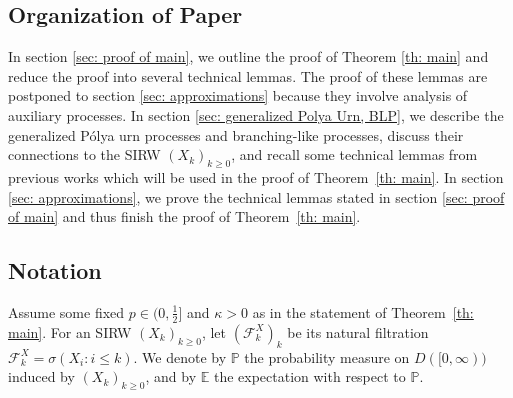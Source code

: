 \documentclass[EJP]{ejpecp} %
\begin{document}
\subsection{Organization of Paper}
In section \ref{sec: proof of main}, we outline the proof of Theorem \ref{th: main} and reduce the proof into several technical lemmas. The proof of these lemmas are postponed to section \ref{sec: approximations} because they involve analysis of auxiliary processes. In section \ref{sec: generalized Polya Urn, BLP}, we describe the generalized P\'{o}lya urn processes and branching-like processes, discuss their connections to the SIRW $(X_k)_{k\geq 0}$, and recall some technical lemmas from previous works which will be used in the proof of Theorem~\ref{th: main}. In section \ref{sec: approximations}, we prove the technical lemmas stated in section \ref{sec: proof of main} and thus finish the proof of Theorem~\ref{th: main}. 

\subsection{Notation}

Assume some fixed $p \in (0,\frac{1}{2}]$ and $\kappa > 0$ as in the statement of Theorem~\ref{th: main}. For an SIRW $(X_k)_{k\geq 0}$, let $(\mathcal{F}^X_k)_k$ be its natural filtration $\mathcal{F}^X_k = \sigma\left(X_i: i\leq k \right).$ 
We denote by $\mathbb{P}$ the probability measure on $D([0,\infty))$ induced by $(X_k)_{k\geq 0}$, and by $\mathbb{E}$ the expectation with respect to $\mathbb{P}$.
\end{document}
